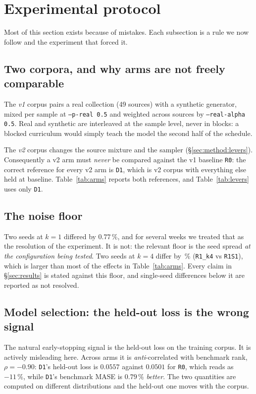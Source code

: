 \section{Experimental protocol}
\label{sec:protocol}

Most of this section exists because of mistakes. Each subsection is a rule we
now follow and the experiment that forced it.

\subsection{Two corpora, and why arms are not freely comparable}

The \emph{v1} corpus pairs a real collection (49 sources) with a synthetic
generator, mixed per sample at \texttt{--p-real 0.5} and weighted across
sources by \texttt{--real-alpha 0.5}. Real and synthetic are interleaved at the
sample level, never in blocks: a blocked curriculum would simply teach the
model the second half of the schedule.

The \emph{v2} corpus changes the source mixture and the sampler
(\S\ref{sec:method:levers}). Consequently a v2 arm must \emph{never} be
compared against the v1 baseline \texttt{R0}: the correct reference for every
v2 arm is \texttt{D1}, which is v2 corpus with everything else held at
baseline. Table~\ref{tab:arms} reports both references, and
Table~\ref{tab:levers} uses only \texttt{D1}.

\subsection{The noise floor}

Two seeds at $k=1$ differed by $0.77\,\%$, and for several weeks we treated
that as the resolution of the experiment. It is not: the relevant floor is the
seed spread \emph{at the configuration being tested}. Two seeds at $k=4$
differ by \NoiseFloorKFour\,\% (\texttt{R1\_k4} vs \texttt{R1S1}), which is
larger than most of the effects in Table~\ref{tab:arms}. Every claim in
\S\ref{sec:results} is stated against this floor, and single-seed differences
below it are reported as not resolved.

\subsection{Model selection: the held-out loss is the wrong signal}

The natural early-stopping signal is the held-out loss on the training corpus.
It is actively misleading here. Across arms it is \emph{anti}-correlated with
benchmark rank, $\rho = -0.90$: \texttt{D1}'s held-out loss is $0.0557$ against
$0.0501$ for \texttt{R0}, which reads as $-11\,\%$, while \texttt{D1}'s
benchmark MASE is $0.79\,\%$ \emph{better}. The two quantities are computed on
different distributions and the held-out one moves with the corpus.


